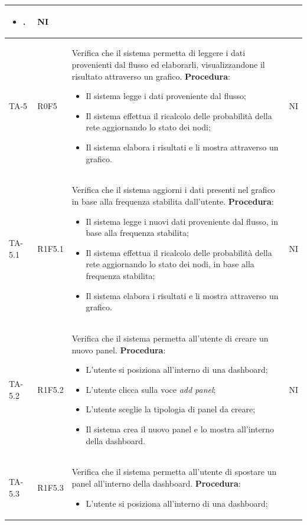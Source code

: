 \begin{longtable}{|C{2.5cm}|C{2.5cm}|L{6.5cm}|C{1.5cm}|}
\begin{itemize}
		\item .
	\end{itemize}
	& {NI}\\
	\hline
	{TA-5} & {R0F5} & 
	Verifica che il sistema permetta di leggere i dati provenienti dal flusso ed elaborarli, visualizzandone il risultato attraverso un grafico.
	\textbf{Procedura}:
	\begin{itemize}		
		\item Il sistema legge i dati proveniente dal flusso;
		\item Il sistema effettua il ricalcolo delle probabilità della rete aggiornando lo stato dei nodi;
		\item Il sistema elabora i risultati e li mostra attraverso un grafico.
	\end{itemize}
	 & {NI}\\
	\hline
	{TA-5.1} & {R1F5.1} & 
	Verifica che il sistema aggiorni i dati presenti nel grafico in base alla frequenza stabilita dall'utente.
	\textbf{Procedura}:
	\begin{itemize}		
		\item Il sistema legge i nuovi dati proveniente dal flusso, in base alla frequenza stabilita;
		\item Il sistema effettua il ricalcolo delle probabilità della rete aggiornando lo stato dei nodi, in base alla frequenza stabilita;
		\item Il sistema elabora i risultati e li mostra attraverso un grafico.
	\end{itemize}
	 & {NI}\\
	\hline
	{TA-5.2} & {R1F5.2} & 
	Verifica che il sistema permetta all'utente di creare un nuovo panel.
	\textbf{Procedura}:
	\begin{itemize}		
		\item L'utente si posiziona all'interno di una dashboard;
		\item L'utente clicca sulla voce \emph{add panel};
		\item L'utente sceglie la tipologia di panel da creare;
		\item Il sistema crea il nuovo panel e lo mostra all'interno della dashboard.
	\end{itemize}
	 & {NI}\\
	\hline
	{TA-5.3} & {R1F5.3} & 
	Verifica che il sistema permetta all'utente di spostare un panel all'interno della dashboard.
	\textbf{Procedura}:
	\begin{itemize}		
		\item L'utente si posiziona all'interno di una dashboard;

\end{itemize}
\end{longtable}
